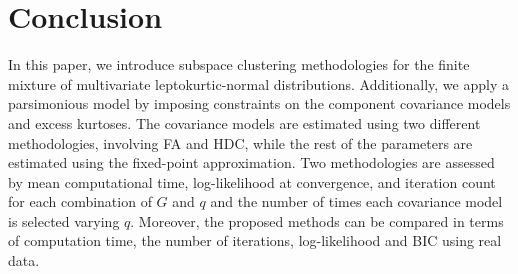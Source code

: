 \documentclass[11pt]{article}
\begin{document}
\section{Conclusion} 
In this paper, we introduce subspace clustering methodologies for the finite mixture of multivariate leptokurtic-normal distributions. Additionally, we apply a parsimonious model by imposing constraints on the component covariance models and excess kurtoses. The covariance models are estimated using two different methodologies, involving FA and HDC, while the rest of the parameters are estimated using the fixed-point approximation. Two methodologies are assessed by mean computational time, log-likelihood at convergence, and iteration count for each combination of $G$ and $q$ and the number of times each covariance model is selected varying $q$. Moreover, the proposed methods can be compared in terms of computation time, the number of iterations, log-likelihood and BIC using real data.
\\
\end{document}
